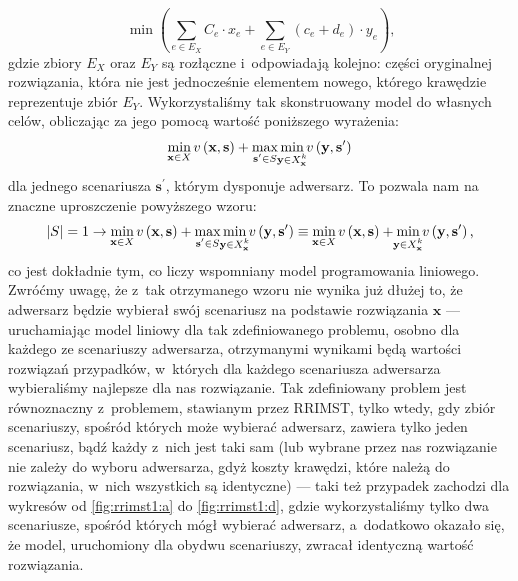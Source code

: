 \begin{equation}
	\min \left( \sum_{e \in E_{X}} C_{e} \cdot x_{e} + \sum_{e \in E_{Y}} \left( c_{e} + d_{e} \right) \cdot y_{e} \right)\text{,}
\end{equation}
gdzie zbiory $E_{X}$ oraz $E_{Y}$ są rozłączne i~odpowiadają kolejno: części oryginalnej rozwiązania, która nie jest jednocześnie elementem nowego, którego krawędzie reprezentuje zbiór $E_{Y}$. Wykorzystaliśmy tak skonstruowany model do własnych celów, obliczając za jego pomocą wartość poniższego wyrażenia:
\begin{equation}
\min_{\mathclap{\textbf{x} \in X}} v \left( \textbf{x}, \textbf{s} \right) + \max_{\mathclap{\textbf{s}^{\prime} \in S}} \min_{\mathclap{\textbf{y} \in X^{k}_{\textbf{x}}}} v \left( \textbf{y}, \textbf{s}^{\prime} \right)
\end{equation}
dla jednego scenariusza $\textbf{s}^{\prime}$, którym dysponuje adwersarz. To pozwala nam na znaczne uproszczenie powyższego wzoru:
\begin{equation}
 \left| S \right| = 1 \rightarrow \min_{\mathclap{\textbf{x} \in X}} v \left( \textbf{x}, \textbf{s} \right) + \max_{\mathclap{\textbf{s}^{\prime} \in S}} \min_{\mathclap{\textbf{y} \in X^{k}_{\textbf{x}}}} v \left( \textbf{y}, \textbf{s}^{\prime} \right) \equiv \min_{\mathclap{\textbf{x} \in X}} v \left( \textbf{x}, \textbf{s} \right) + \min_{\mathclap{\textbf{y} \in X^{k}_{\textbf{x}}}} v \left( \textbf{y}, \textbf{s}^{\prime} \right)\text{,}
\end{equation}
co jest dokładnie tym, co liczy wspomniany model programowania liniowego. Zwróćmy uwagę, że z~tak otrzymanego wzoru nie wynika już dłużej to, że adwersarz będzie wybierał swój scenariusz na podstawie rozwiązania $\textbf{x}$ --- uruchamiając model liniowy dla tak zdefiniowanego problemu, osobno dla każdego ze scenariuszy adwersarza, otrzymanymi wynikami będą wartości rozwiązań przypadków, w~których dla każdego scenariusza adwersarza wybieraliśmy najlepsze dla nas rozwiązanie. Tak zdefiniowany problem jest równoznaczny z~problemem, stawianym przez \textsc{RRIMST}, tylko wtedy, gdy zbiór scenariuszy, spośród których może wybierać adwersarz, zawiera tylko jeden scenariusz, bądź każdy z~nich jest taki sam (lub wybrane przez nas rozwiązanie nie zależy do wyboru adwersarza, gdyż koszty krawędzi, które należą do rozwiązania, w~nich wszystkich są identyczne) --- taki też przypadek zachodzi dla wykresów od \ref{fig:rrimst1:a} do \ref{fig:rrimst1:d}, gdzie wykorzystaliśmy tylko dwa scenariusze, spośród których mógł wybierać adwersarz, a~dodatkowo okazało się, że model, uruchomiony dla obydwu scenariuszy, zwracał identyczną wartość rozwiązania.

